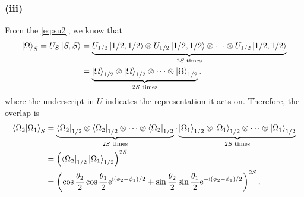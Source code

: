 \documentclass{article}
\newcommand{\ii}{\mathrm{i}}
\newcommand{\me}{\mathrm{e}}
\begin{document}
\subsubsection*{(iii)}
From the \cref{eq:su2}, we know that 
\begin{equation}
    \begin{split}
        \ket{\Omega}_S=U_{S}\ket{S,S}&=\underbrace{U_{1/2}\ket{1/2,1/2}\otimes U_{1/2}\ket{1/2,1/2}\otimes\dots\otimes U_{1/2}\ket{1/2,1/2}}_{2S \text{ times}}\\
                                     &=\underbrace{\ket{\Omega}_{1/2}\otimes\ket{\Omega}_{1/2}\otimes\dots\otimes\ket{\Omega}_{1/2}}_{2S \text{ times}}.
    \end{split}
\end{equation}
where the underscript in $U$ indicates the representation it acts on.
Therefore, the overlap is
\begin{equation}
    \begin{split}
        \bra{\Omega_2}\ket{\Omega_1}_S&=\underbrace{\bra{\Omega_2}_{1/2}\otimes\bra{\Omega_2}_{1/2}\otimes\dots\otimes\bra{\Omega_2}_{1/2}}_{2S \text{ times}} \cdot \underbrace{\ket{\Omega_1}_{1/2}\otimes\ket{\Omega_1}_{1/2}\otimes\dots\otimes\ket{\Omega_1}_{1/2}}_{2S \text{ times}}\\
                                      &=\left(\bra{\Omega_2}_{1/2}\ket{\Omega_1}_{1/2}\right)^{2S}\\
                                      &=\left(\cos\frac{\theta_2}{2}\cos\frac{\theta_1}{2}\me^{\ii(\phi_2-\phi_1)/2}+\sin\frac{\theta_2}{2}\sin\frac{\theta_1}{2}\me^{-\ii(\phi_2-\phi_1)/2}\right)^{2S}.
    \end{split}
\end{equation}
\end{document}
